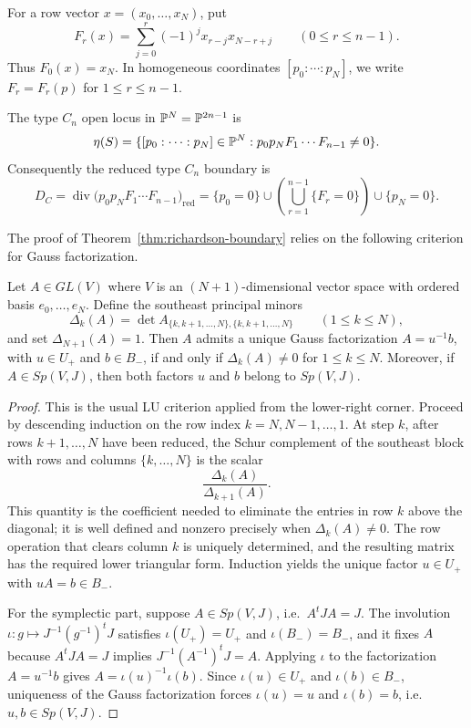 For a row vector \(x=(x_0,\ldots,x_N)\), put
\[
F_r(x)=\sum_{j=0}^r(-1)^jx_{r-j}x_{N-r+j}
\qquad(0\le r\le n-1).
\]
Thus \(F_0(x)=x_N\). In homogeneous coordinates \([p_0:\cdots:p_N]\), we write \(F_r=F_r(p)\) for \(1\le r\le n-1\).

\begin{thm}\label{thm:richardson-boundary}
The type \(C_n\) open locus in \(\mathbb{P}^N=\mathbb{P}^{2n-1}\) is
\[
\eta(S)=
\{[p_0:\cdots:p_N]\in \mathbb{P}^N:
 p_0p_NF_1\cdots F_{n-1}\ne0\}.
\]
Consequently the reduced type \(C_n\) boundary is
\[
D_C
=
\operatorname{div}\bigl(p_0p_NF_1\cdots F_{n-1}\bigr)_{\mathrm{red}}
=
\{p_0=0\}
\cup
\left(\bigcup_{r=1}^{n-1}\{F_r=0\}\right)
\cup
\{p_N=0\}.
\]
\end{thm}

The proof of Theorem~\ref{thm:richardson-boundary} relies on the following criterion for Gauss factorization.
\begin{lemma}\label{lem:southeast-elimination}
Let \(A\in GL(V)\) where \(V\) is an \((N+1)\)-dimensional vector space with ordered basis \(e_0,\dots,e_N\).
Define the southeast principal minors
\[
\Delta_k(A)=
\det A_{\{k,k+1,\dots,N\},\{k,k+1,\dots,N\}}
\qquad(1\le k\le N),
\]
and set \(\Delta_{N+1}(A)=1\).
Then \(A\) admits a unique Gauss factorization \(A=u^{-1}b\), with \(u\in U_+\) and \(b\in B_-\), if and only if \(\Delta_k(A)\neq 0\) for \(1\le k\le N\).
Moreover, if \(A\in Sp(V,J)\), then both factors \(u\) and \(b\) belong to \(Sp(V,J)\).
\end{lemma}

\begin{proof}
This is the usual LU criterion applied from the lower-right corner.
Proceed by descending induction on the row index \(k=N,N-1,\dots,1\).
At step \(k\), after rows \(k+1,\dots,N\) have been reduced, the Schur complement of the southeast block with rows and columns \(\{k,\dots,N\}\) is the scalar
\[
\frac{\Delta_k(A)}{\Delta_{k+1}(A)}.
\]
This quantity is the coefficient needed to eliminate the entries in row \(k\) above the diagonal; it is well defined and nonzero precisely when \(\Delta_k(A)\neq 0\).
The row operation that clears column \(k\) is uniquely determined, and the resulting matrix has the required lower triangular form.
Induction yields the unique factor \(u\in U_+\) with \(uA=b\in B_-\).

For the symplectic part, suppose \(A\in Sp(V,J)\), i.e.\ \(A^tJA=J\).
The involution \(\iota\colon g\mapsto J^{-1}(g^{-1})^tJ\) satisfies \(\iota(U_+)=U_+\) and \(\iota(B_-)=B_-\), and it fixes \(A\) because \(A^tJA=J\) implies \(J^{-1}(A^{-1})^tJ=A\).
Applying \(\iota\) to the factorization \(A=u^{-1}b\) gives \(A=\iota(u)^{-1}\iota(b)\).
Since \(\iota(u)\in U_+\) and \(\iota(b)\in B_-\), uniqueness of the Gauss factorization forces \(\iota(u)=u\) and \(\iota(b)=b\), i.e.\ \(u,b\in Sp(V,J)\).
\end{proof}

